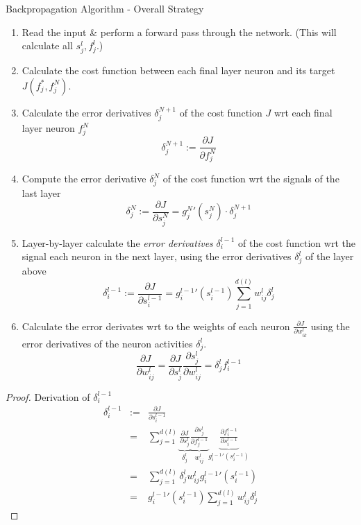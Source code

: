 \documentclass[11pt,a4paper]{article}
\begin{document}
\begin{proposition}{Backpropagation Algorithm - Overall Strategy}
  \begin{enumerate}
    \item Read the input \& perform a forward pass through the network. (This will calculate all $s_j^l,f_j^l$.)
    \item Calculate the cost function between each final layer neuron and its target $J(f_j^*,f_j^N)$.
    \item Calculate the error derivatives $\delta_j^{N+1}$ of the cost function $J$ wrt each final layer neuron $f_j^N$
    \[ \delta_j^{N+1}:=\frac{\partial J}{\partial f_j^N} \]
    \item Compute the error derivative $\delta_j^N$ of the cost function wrt the signals of the last layer
    \[ \delta_j^N:=\frac{\partial J}{\partial s_j^N}=g_j^N'(s_j^N)\cdot\delta_j^{N+1} \]
    \item Layer-by-layer calculate the \textit{error derivatives} $\delta_i^{l-1}$ of the cost function wrt the signal each neuron in the next layer, using the error derivatives $\delta_j^l$ of the layer above
    \[ \delta_i^{l-1}:=\frac{\partial J}{\partial s_i^{l-1}}=g_i^{l-1}'(s_i^{l-1})\sum_{j=1}^{d(l)}w_{ij}^l\delta_j^l \]
    \item Calculate the error derivates wrt to the weights of each neuron $\frac{\partial J}{\partial w_{ik}^l}$ using the error derivatives of the neuron activities $\delta_j^l$.
    \[ \frac{\partial J}{\partial w_{ij}^l}=\frac{\partial J}{\partial s_j^l}\frac{\partial s_j^l}{\partial w_{ij}^l}=\delta_j^lf_i^{l-1} \]
  \end{enumerate}
\end{proposition}

\begin{proof}{Derivation of $\delta_i^{l-1}$}
  \[\begin{array}{rrl}
    \delta_i^{l-1}&:=&\frac{\partial J}{\partial s_i^{l-1}}\\
    &=&\displaystyle\sum_{j=1}^{d(l)}\underbrace{\frac{\partial J}{\partial s_j^l}}_{\delta_j^l} \underbrace{\frac{\partial s_j^l}{\partial f_j^{l-1}}}_{w_{ij}^l} \underbrace{\frac{\partial f_i^{l-1}}{\partial s_i^{l-1}}}_{g^{l-1}_i'(s_i^{l-1})}\\
    &=&\displaystyle\sum_{j=1}^{d(l)}\delta_j^lw_{ij}^lg_i^{l-1}'(s_i^{l-1})\\
    &=&\displaystyle g_i^{l-1}'(s_i^{l-1})\sum_{j=1}^{d(l)}w_{ij}^l\delta_j^l
    \end{array}\]
\end{proof}
\end{document}
